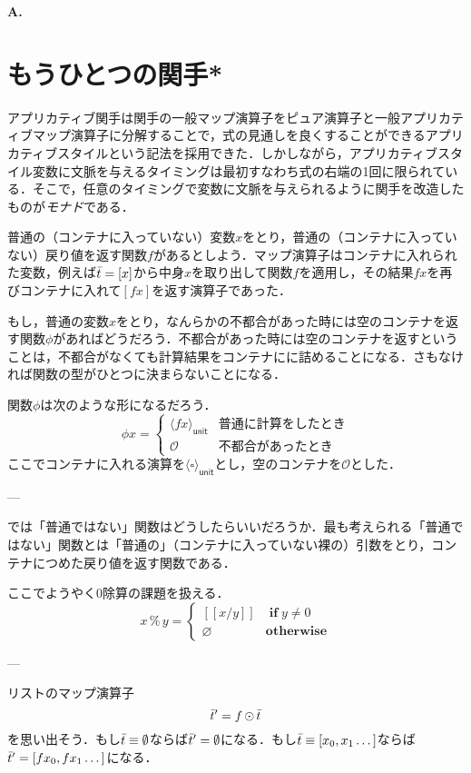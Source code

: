 \documentclass[twocolumn]{jsbook}
\def\[{[\![}
\def\]{]\!]}
\newcommand{\keyword}[1]{{\emph{#1}}}
\newenvironment{leader}{\begingroup\bf}{\endgroup}
\DeclareMathOperator{\hsklMap}{\odot}
\newcommand{\hsklEmptyList}{\emptyset}
\newcommand{\hsklNothing}{\varnothing}
\newcommand{\hsklJust}[1]{\[#1\]}
\newcommand{\hsklList}[1]{\Bar{#1}}
\newcommand{\hsklUnit}[1]{\langle#1\rangle_\textsf{unit}}
\newcommand{\mathKeyword}[1]{\mathbf{#1}}
\DeclareMathOperator{\mathIf}{\mathKeyword{if}}
\newcommand{\mathOtherwise}{\mathKeyword{otherwise}}
\newcommand{\mathSomething}{\square}
\begin{document}
\begin{leader}
A.
\end{leader}


\section{もうひとつの関手*}


アプリカティブ関手は関手の一般マップ演算子をピュア演算子と一般アプリカティブマップ演算子に分解することで，式の見通しを良くすることができるアプリカティブスタイルという記法を採用できた．しかしながら，アプリカティブスタイル変数に文脈を与えるタイミングは最初すなわち式の右端の1回に限られている．そこで，任意のタイミングで変数に文脈を与えられるように関手を改造したものが\keyword{モナド}である．

普通の（コンテナに入っていない）変数$x$をとり，普通の（コンテナに入っていない）戻り値を返す関数$f$があるとしよう．マップ演算子はコンテナに入れられた変数，例えば$\hsklList{t}=[x]$から中身$x$を取り出して関数$f$を適用し，その結果$fx$を再びコンテナに入れて$[fx]$を返す演算子であった．

もし，普通の変数$x$をとり，なんらかの不都合があった時には空のコンテナを返す関数$\phi$があればどうだろう．不都合があった時には空のコンテナを返すということは，不都合がなくても計算結果をコンテナにに詰めることになる．さもなければ関数の型がひとつに決まらないことになる．

関数$\phi$は次のような形になるだろう．
$$\phi x=\begin{cases}\hsklUnit{fx}&\text{普通に計算をしたとき}\\
\mathcal{O}&\text{不都合があったとき}\end{cases}$$
ここでコンテナに入れる演算を$\hsklUnit{\mathSomething}$とし，空のコンテナを$\mathcal{O}$とした．

---

では「普通ではない」関数はどうしたらいいだろうか．最も考えられる「普通ではない」関数とは「普通の」（コンテナに入っていない裸の）引数をとり，コンテナにつめた戻り値を返す関数である．

ここでようやく$0$除算の課題を扱える．
$$x\mathop{\%}y=\begin{cases}
\hsklJust{x/y}&\mathIf y\neq0\\
\hsklNothing&\mathOtherwise
\end{cases}
$$

---

リストのマップ演算子$$\hsklList{t}'=f\hsklMap\hsklList{t}$$を思い出そう．もし$\hsklList{t}\equiv\hsklEmptyList$ならば$\hsklList{t}'=\hsklEmptyList$になる．もし$\hsklList{t}\equiv[x_0,x_1\dots]$ならば$\hsklList{t}'=[fx_0,fx_1\dots]$になる．
\end{document}
